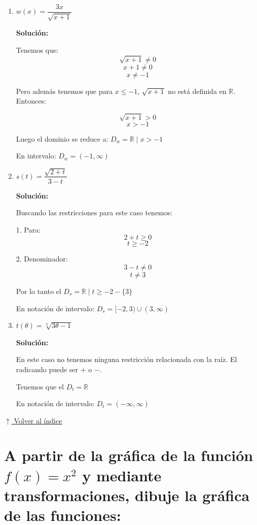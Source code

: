 \documentclass[12pt]{article}
\newcommand{\volverindice}{%
    \vspace{1em}%
    \begin{flushright}%
        \hyperlink{indice}{\small $\uparrow$ Volver al índice}%
    \end{flushright}%
}
\begin{document}
\begin{enumerate}[label=\alph*.-]
    El radicando debe ser $\geq 0$
    
    Tenemos $t^2$, el cual siempre es $\geq 0$

    Luego $D_e = \mathbb{R}$.
    
    En notación de intervalo $D_e = (-\infty, \infty)$
    
    \item $w(x) = \dfrac{3x}{\sqrt{x+1}}$
    
    \textbf{Solución:}
    
    Tenemos que:
    \[\sqrt{x+1} \neq 0\]
    \[x + 1 \neq 0\]
    \[x \neq -1\]
    
    Pero además tenemos que para $x \leq -1$, $\sqrt{x+1}$ no está definida en $\mathbb{R}$. Entonces:
    
    \[\sqrt{x+1} > 0\]
    \[x > -1\]
    
    Luego el dominio se reduce a: $D_w = \mathbb{R} \mid x > -1$
    
    En intervalo: $D_w = (-1, \infty)$
    
    \newpage
    
    \item $s(t) = \dfrac{\sqrt{2+t}}{3-t}$
    
    \textbf{Solución:}
    
    Buscando las restricciones para este caso tenemos:
    
    1. Para:
    \[2 + t \geq 0\]
    \[t \geq -2\]
    
    2. Denominador:
    \[3 - t \neq 0\]
    \[t \neq 3\]
    
    Por lo tanto el $D_s = \mathbb{R} \mid t \geq -2 - \{3\}$
    
    En notación de intervalo: $D_s = [-2, 3) \cup (3, \infty)$
    
    \item $t(\theta) = \sqrt[3]{3\theta - 1}$
    
    \textbf{Solución:}
    
    En este caso no tenemos ninguna restricción relacionada con la raíz. El radicando puede ser $+$ o $-$.
    
    Tenemos que el $D_t = \mathbb{R}$
    
    En notación de intervalo: $D_t = (-\infty, \infty)$
\end{enumerate}

\volverindice
\newpage

\section[Transformaciones de funciones]{A partir de la gráfica de la función $f(x) = x^2$ y mediante transformaciones, dibuje la gráfica de las funciones:}
\end{document}
